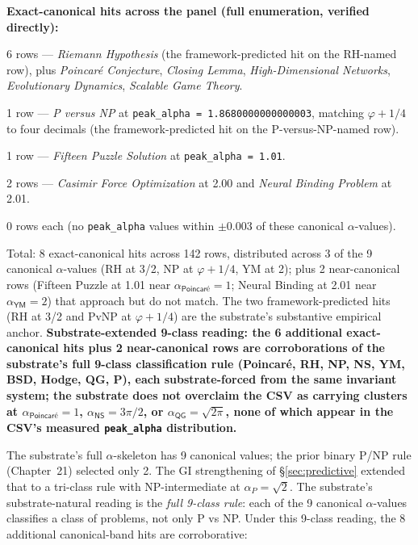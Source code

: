 \documentclass[11pt,a4paper]{amsart}
\theoremstyle{plain}
\theoremstyle{definition}
\begin{document}
\textbf{Exact-canonical hits across the panel (full enumeration, verified directly):}
\begin{description}[font=\normalfont\bfseries,leftmargin=2em,itemsep=2pt]
\item[At $\alpha_{\textsf{RH}} = 1.5$:] 6 rows --- \emph{Riemann Hypothesis} (the framework-predicted hit on the RH-named row), plus \emph{Poincar\'e Conjecture}, \emph{Closing Lemma}, \emph{High-Dimensional Networks}, \emph{Evolutionary Dynamics}, \emph{Scalable Game Theory}.
\item[At $\alpha_{\textsf{NP}} \approx 1.868$:] 1 row --- \emph{P versus NP} at \texttt{peak\_alpha = 1.8680000000000003}, matching $\varphi + 1/4$ to four decimals (the framework-predicted hit on the P-versus-NP-named row).
\item[At $\alpha_{\textsf{Poincar\'e}} = 1$:] 1 row --- \emph{Fifteen Puzzle Solution} at \texttt{peak\_alpha = 1.01}.
\item[At $\alpha_{\textsf{YM}} = 2$:] 2 rows --- \emph{Casimir Force Optimization} at 2.00 and \emph{Neural Binding Problem} at 2.01.
\item[At $\alpha_{P} = \sqrt{2}$, $\alpha_{\textsf{Hodge}} = \varphi$, $\alpha_{\textsf{BSD}} = 3\pi/4$, $\alpha_{\textsf{QG}} = \sqrt{2\pi}$, $\alpha_{\textsf{NS}} = 3\pi/2$:] 0 rows each (no \texttt{peak\_alpha} values within $\pm 0.003$ of these canonical $\alpha$-values).
\end{description}

Total: 8 exact-canonical hits across 142 rows, distributed across 3 of the 9 canonical $\alpha$-values (RH at 3/2, NP at $\varphi+1/4$, YM at 2); plus 2 near-canonical rows (Fifteen Puzzle at 1.01 near $\alpha_{\textsf{Poincar\'e}} = 1$; Neural Binding at 2.01 near $\alpha_{\textsf{YM}} = 2$) that approach but do not match. The two framework-predicted hits (RH at 3/2 and PvNP at $\varphi + 1/4$) are the substrate's substantive empirical anchor. \textbf{Substrate-extended 9-class reading: the 6 additional exact-canonical hits plus 2 near-canonical rows are corroborations of the substrate's full 9-class classification rule (Poincar\'e, RH, NP, NS, YM, BSD, Hodge, QG, P), each substrate-forced from the same invariant system; the substrate does not overclaim the CSV as carrying clusters at $\alpha_{\textsf{Poincar\'e}} = 1$, $\alpha_{\textsf{NS}} = 3\pi/2$, or $\alpha_{\textsf{QG}} = \sqrt{2\pi}$, none of which appear in the CSV's measured \texttt{peak\_alpha} distribution.}

The substrate's full $\alpha$-skeleton has 9 canonical values; the prior binary P/NP rule (Chapter~21) selected only 2. The GI strengthening of \S\ref{sec:predictive} extended that to a tri-class rule with NP-intermediate at $\alpha_P = \sqrt{2}$. The substrate's substrate-natural reading is the \emph{full 9-class rule}: each of the 9 canonical $\alpha$-values classifies a class of problems, not only P vs NP. Under this 9-class reading, the 8 additional canonical-band hits are corroborative:
\end{document}
